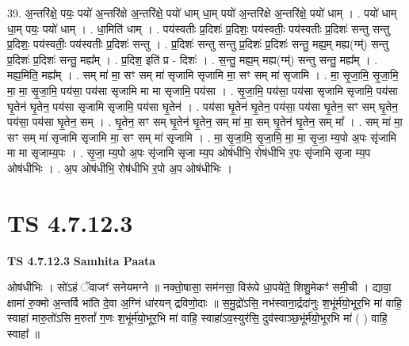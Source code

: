 \documentclass[17pt]{extarticle}
\begin{document}
39. अ॒न्तरि॑क्षे॒ पयः॒ पयो॑ अ॒न्तरि॑क्षे अ॒न्तरि॑क्षे॒ पयो॑ धाम् धा॒म् पयो॑ अ॒न्तरि॑क्षे अ॒न्तरि॑क्षे॒ पयो॑ धाम् । . पयो॑ धाम् धा॒म् पयः॒ पयो॑ धाम् । . धा॒मिति॑ धाम् । . पय॑स्वतीः प्र॒दिशः॑ प्र॒दिशः॒ पय॑स्वतीः॒ पय॑स्वतीः प्र॒दिशः॑ सन्तु सन्तु प्र॒दिशः॒ पय॑स्वतीः॒ पय॑स्वतीः प्र॒दिशः॑ सन्तु । . प्र॒दिशः॑ सन्तु सन्तु प्र॒दिशः॑ प्र॒दिशः॑ सन्तु॒ मह्य॒म् मह्य(ग्म्॑) सन्तु प्र॒दिशः॑ प्र॒दिशः॑ सन्तु॒ मह्य᳚म् । . प्र॒दिश॒ इति॑ प्र - दिशः॑ । . स॒न्तु॒ मह्य॒म् मह्य(ग्म्॑) सन्तु सन्तु॒ मह्य᳚म् । . मह्य॒मिति॒ मह्य᳚म् । . सम् मा॑ मा॒ सꣳ सम् मा॑ सृजामि सृजामि मा॒ सꣳ सम् मा॑ सृजामि । . मा॒ सृ॒जा॒मि॒ सृ॒जा॒मि॒ मा॒ मा॒ सृ॒जा॒मि॒ पय॑सा॒ पय॑सा सृजामि मा मा सृजामि॒ पय॑सा । . सृ॒जा॒मि॒ पय॑सा॒ पय॑सा सृजामि सृजामि॒ पय॑सा घृ॒तेन॑ घृ॒तेन॒ पय॑सा सृजामि सृजामि॒ पय॑सा घृ॒तेन॑ । . पय॑सा घृ॒तेन॑ घृ॒तेन॒ पय॑सा॒ पय॑सा घृ॒तेन॒ सꣳ सम् घृ॒तेन॒ पय॑सा॒ पय॑सा घृ॒तेन॒ सम् । . घृ॒तेन॒ सꣳ सम् घृ॒तेन॑ घृ॒तेन॒ सम् मा॑ मा॒ सम् घृ॒तेन॑ घृ॒तेन॒ सम् मा᳚ । . सम् मा॑ मा॒ सꣳ सम् मा॑ सृजामि सृजामि मा॒ सꣳ सम् मा॑ सृजामि । . मा॒ सृ॒जा॒मि॒ सृ॒जा॒मि॒ मा॒ मा॒ सृ॒जा॒ म्य॒पो अ॒पः सृ॑जामि मा मा सृजाम्य॒पः । . सृ॒जा॒ म्य॒पो अ॒पः सृ॑जामि सृजा म्य॒प ओष॑धीभि॒ रोष॑धीभि र॒पः सृ॑जामि सृजा म्य॒प ओष॑धीभिः । . अ॒प ओष॑धीभि॒ रोष॑धीभि र॒पो अ॒प ओष॑धीभिः । \newline
\pagebreak
{}

\section{ TS 4.7.12.3 }

\textbf{TS 4.7.12.3 } \newline
\textbf{Samhita Paata} \newline

ओष॑धीभिः । सो॑ऽहं ॅवाजꣳ॑ सनेयमग्ने ॥ नक्तो॒षासा॒ सम॑नसा॒ विरू॑पे धा॒पये॑ते॒ शिशु॒मेकꣳ॑ समी॒ची । द्यावा॒ क्षामा॑ रु॒क्मो अ॒न्तर्वि भा॑ति दे॒वा अ॒ग्निं धा॑रयन् द्रविणो॒दाः ॥ स॒मु॒द्रो॑ऽसि॒ नभ॑स्वाना॒र्द्रदा॑नुः श॒भूंर्म॑यो॒भूर॒भि मा॑ वाहि॒ स्वाहा॑ मारु॒तो॑ऽसि म॒रुतां᳚ ग॒णः श॒भूंर्म॑यो॒भूर॒भि मा॑ वाहि॒ स्वाहा॑ऽव॒स्युर॑सि॒ दुव॑स्वाञ्छ॒भूंर्म॑यो॒भूरभि मा॑ ( ) वाहि॒ स्वाहा᳚ ॥ \newline
\end{document}
